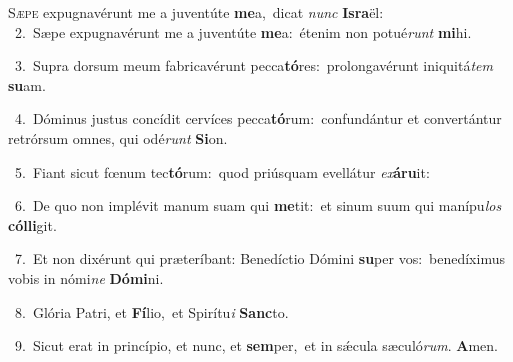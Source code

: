\lettrine{\initial\textcolor{\initialcolor}{S}}{æpe} expugnavérunt me a juventúte \textbf{me}\-a,~\star dicat \textit{nunc} \textbf{Is}\-\textbf{ra}ël:\\
{\numbfont\textcolor{\numbcolor}{~2.}}~Sæpe expugnavérunt me a juventúte \textbf{me}\-a:~\star étenim non potué\textit{runt} \textbf{mi}\-hi.\par
{\numbfont\textcolor{\numbcolor}{~3.}}~Supra dorsum meum fabricavérunt pecca\-\textbf{tó}\-res:~\star prolongavérunt iniquitá\textit{tem} \textbf{su}\-am.\par
{\numbfont\textcolor{\numbcolor}{~4.}}~Dóminus justus concídit cervíces pecca\-\textbf{tó}\-rum:~\star confundántur et convertántur retrórsum omnes, qui odé\textit{runt} \textbf{Si}\-on.\par
{\numbfont\textcolor{\numbcolor}{~5.}}~Fiant sicut fœnum tec\-\textbf{tó}\-rum:~\star quod priúsquam evellátur \textit{ex}\-\textbf{á}\textbf{ru}it:\par
{\numbfont\textcolor{\numbcolor}{~6.}}~De quo non implévit manum suam qui \textbf{me}\-tit:~\star et sinum suum qui manípu\textit{los} \textbf{cól}\-\textbf{li}git.\par
{\numbfont\textcolor{\numbcolor}{~7.}}~Et non dixérunt qui præteríbant: Benedíctio Dómini \textbf{su}\-per vos:~\star benedíximus vobis in nómi\textit{ne} \textbf{Dó}\-\textbf{mi}ni.\par
{\numbfont\textcolor{\numbcolor}{~8.}}~Glória Patri, et \textbf{Fí}\-lio,~\star et Spirítu\textit{i} \textbf{Sanc}\-to.\par
{\numbfont\textcolor{\numbcolor}{~9.}}~Sicut erat in princípio, et nunc, et \textbf{sem}\-per,~\star et in sǽcula sæculó\-\textit{rum}\-. \textbf{A}\-men.\par
